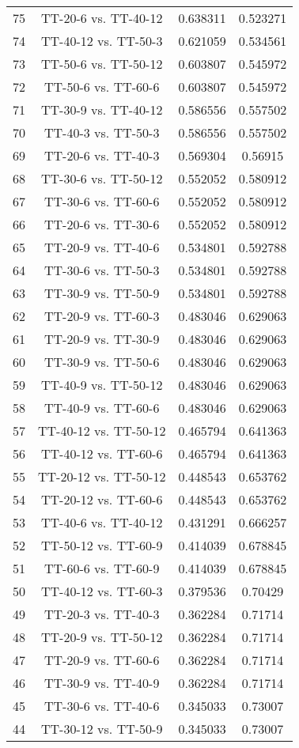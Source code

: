 \documentclass[a4paper,10pt]{article}
\begin{document}
\begin{landscape}
\begin{table}[!htp]
\begin{tabular}{cccc}
75&TT-20-6 vs. TT-40-12&0.638311&0.523271\\
74&TT-40-12 vs. TT-50-3&0.621059&0.534561\\
73&TT-50-6 vs. TT-50-12&0.603807&0.545972\\
72&TT-50-6 vs. TT-60-6&0.603807&0.545972\\
71&TT-30-9 vs. TT-40-12&0.586556&0.557502\\
70&TT-40-3 vs. TT-50-3&0.586556&0.557502\\
69&TT-20-6 vs. TT-40-3&0.569304&0.56915\\
68&TT-30-6 vs. TT-50-12&0.552052&0.580912\\
67&TT-30-6 vs. TT-60-6&0.552052&0.580912\\
66&TT-20-6 vs. TT-30-6&0.552052&0.580912\\
65&TT-20-9 vs. TT-40-6&0.534801&0.592788\\
64&TT-30-6 vs. TT-50-3&0.534801&0.592788\\
63&TT-30-9 vs. TT-50-9&0.534801&0.592788\\
62&TT-20-9 vs. TT-60-3&0.483046&0.629063\\
61&TT-20-9 vs. TT-30-9&0.483046&0.629063\\
60&TT-30-9 vs. TT-50-6&0.483046&0.629063\\
59&TT-40-9 vs. TT-50-12&0.483046&0.629063\\
58&TT-40-9 vs. TT-60-6&0.483046&0.629063\\
57&TT-40-12 vs. TT-50-12&0.465794&0.641363\\
56&TT-40-12 vs. TT-60-6&0.465794&0.641363\\
55&TT-20-12 vs. TT-50-12&0.448543&0.653762\\
54&TT-20-12 vs. TT-60-6&0.448543&0.653762\\
53&TT-40-6 vs. TT-40-12&0.431291&0.666257\\
52&TT-50-12 vs. TT-60-9&0.414039&0.678845\\
51&TT-60-6 vs. TT-60-9&0.414039&0.678845\\
50&TT-40-12 vs. TT-60-3&0.379536&0.70429\\
49&TT-20-3 vs. TT-40-3&0.362284&0.71714\\
48&TT-20-9 vs. TT-50-12&0.362284&0.71714\\
47&TT-20-9 vs. TT-60-6&0.362284&0.71714\\
46&TT-30-9 vs. TT-40-9&0.362284&0.71714\\
45&TT-30-6 vs. TT-40-6&0.345033&0.73007\\
44&TT-30-12 vs. TT-50-9&0.345033&0.73007\\

\end{tabular}
\end{table}
\end{landscape}
\end{document}
